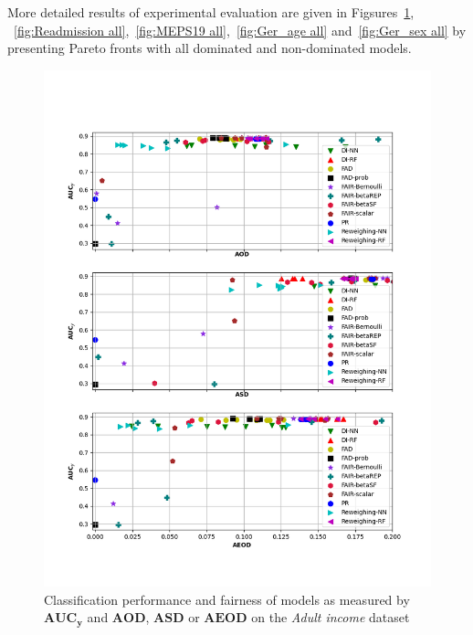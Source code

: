 \documentclass[preprint,12pt]{elsarticle}
\begin{document}
More detailed results of experimental evaluation are given in Figsures~\ref{fig:Adult all}, ~\ref{fig:Readmission all},~\ref{fig:MEPS19 all},~\ref{fig:Ger_age all} and~\ref{fig:Ger_sex all} by presenting Pareto fronts with all dominated and non-dominated models.

\begin{figure}
	\center
	\includegraphics[angle=0, width=1\textwidth]{Adult_all.png}
	\captionsetup{justification=centering}
	\caption{Classification performance and fairness of models as measured by $\mathbf{AUC_y}$ and $\mathbf{AOD}$, $\mathbf{ASD}$ or $\mathbf{AEOD}$ on the \textit{Adult income} dataset}
	\label{fig:Adult all}
	\vskip -0.2in
\end{figure}
\end{document}

